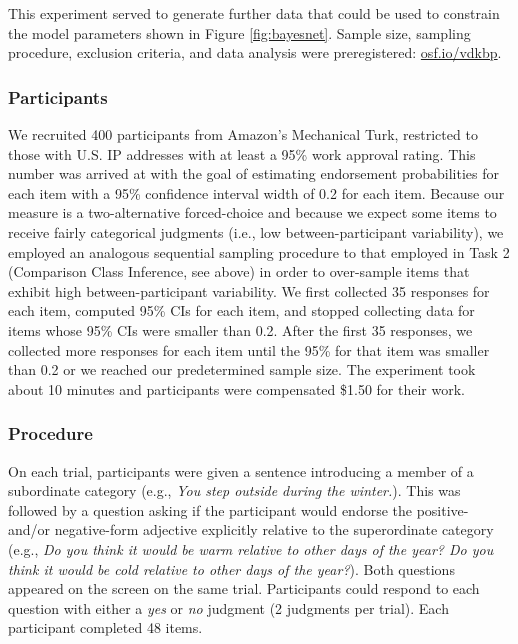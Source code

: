 \documentclass[doc]{apa6}
\begin{document}
This experiment served to generate further data that could be used to constrain the model parameters shown in Figure \ref{fig:bayesnet}.
Sample size, sampling procedure, exclusion criteria, and data analysis were preregistered: \url{osf.io/vdkbp}.

\subsubsection{Participants}

We recruited 400 participants from Amazon's Mechanical Turk, restricted to those with U.S. IP addresses with at least a 95\% work approval rating.
This number was arrived at with the goal of estimating endorsement probabilities for each item with a 95\% confidence interval width of 0.2 for each item.
Because our measure is a two-alternative forced-choice and because we expect some items to receive fairly categorical judgments (i.e., low between-participant variability), we employed an analogous sequential sampling procedure to that employed in Task 2 (Comparison Class Inference, see above) in order to over-sample items that exhibit high between-participant variability.
We first collected 35 responses for each item, computed 95\% CIs for each item, and stopped collecting data for items whose 95\% CIs were smaller than 0.2.
After the first 35 responses, we collected more responses for each item until the 95\% for that item was smaller than 0.2 or we reached our predetermined sample size.
The experiment took about 10 minutes and participants were compensated \$1.50 for their work.

\subsubsection{Procedure}

On each trial, participants were given a sentence introducing a member of a subordinate category (e.g., \emph{You step outside during the winter.}).
This was followed by a question asking if the participant would endorse the positive- and/or negative-form adjective explicitly relative to the superordinate category (e.g., \emph{Do you think it would be warm relative to other days of the year? Do you think it would be cold relative to other days of the year?}).
Both questions appeared on the screen on the same trial.
Participants could respond to each question with either a \emph{yes} or \emph{no} judgment (2 judgments per trial).
Each participant completed 48 items.
\end{document}
